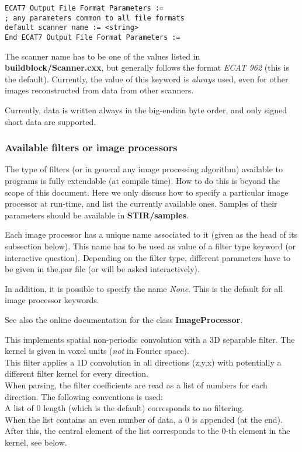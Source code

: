 \documentclass{article}
\newcommand{\tab}{\hspace{5mm}}
\begin{document}
\begin{verbatim}
ECAT7 Output File Format Parameters :=
; any parameters common to all file formats
default scanner name := <string>
End ECAT7 Output File Format Parameters :=
\end{verbatim}

The scanner name has to be one of the values listed in \textbf{buildblock/Scanner.cxx}, 
but generally follows the format \textit{ECAT 962} (this is the default). 
Currently, the value of this keyword is \textit{always} used, even 
for other images reconstructed from data from other scanners.


Currently, data is written always in the big-endian byte order, 
and only signed short data are supported.



\subsubsection{
Available filters or image processors}
\label{sec:filters}
The type of filters (or in general any image processing algorithm) 
available to programs is fully extendable (at compile time). 
How to do this is beyond the scope of this document. Here we 
only discuss how to specify a particular image processor at run-time, 
and list the currently available ones. Samples of their parameters 
should be available in \textbf{STIR/samples}.



Each image processor has a unique name associated to it (given 
as the head of its subsection below). This name has to be used 
as value of a filter type keyword (or interactive question). 
Depending on the filter type, different parameters have to be 
given in the.par file (or will be asked interactively).


In addition, it is possible to specify the name \textit{None}. This 
is the default for all image processor keywords.


See also the online documentation for the class \textbf{ImageProcessor}.

{ 
}

This implements spatial non-periodic convolution with a 3D separable 
filter. The kernel is given in voxel units (\textit{not} in Fourier 
space).\\
This filter applies a 1D convolution in all directions (z,y,x) 
with potentially a different filter kernel for every direction.\\
When parsing, the filter coefficients are read as a list of numbers 
for each direction. The following conventions is used:\\
{\textbullet}\tab 
A list of 0 length (which is the default) corresponds to no filtering.\\
{\textbullet}\tab When the list contains an even number of data, a 0 is 
appended (at the end).\\
{\textbullet}\tab 
After this, the central element of the list corresponds to the 
0-th element in the kernel, see below.
\end{document}
